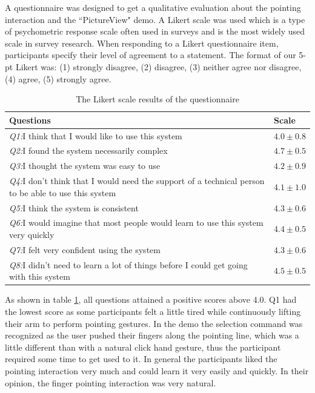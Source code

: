 A questionnaire was designed to get a qualitative evaluation about the pointing interaction and the ``PictureView" demo. A Likert scale was used which is a type of psychometric response scale often used in surveys and is the most widely used scale in survey research. When responding to a Likert questionnaire item, participants specify their level of agreement to a statement. The format of our 5-pt Likert was: (1) strongly disagree, (2) disagree, (3) neither agree nor disagree, (4) agree, (5) strongly agree.
\begin{table}
	\caption{The Likert scale results of the questionnaire}
	\label{tb:4-PAST:questionnaire}
	\scriptsize
	\begin{center}
		\begin{tabular}{p{5.5cm}|p{1.2cm}}
			Questions & Scale \\
			\hline
			\textit{Q1:}I think that I would like to use this system &  $4.0\pm0.8$ \\
			\textit{Q2:}I found the system necessarily complex & $4.7\pm0.5$ \\
			\textit{Q3:}I thought the system was easy to use & $4.2\pm0.9$ \\
			\textit{Q4:}I don't think that I would need the support of a technical person to be able to use this system & $4.1\pm1.0$\\
			\textit{Q5:}I  think the system is consistent & $4.3\pm0.6$ \\
			\textit{Q6:}I would imagine that most people would learn to use this system very quickly & $4.4\pm0.5$ \\
			\textit{Q7:}I felt very confident using the system & $4.3\pm0.6$ \\
			\textit{Q8:}I didn't need to learn a lot of things before I could get going with this system & $4.5\pm0.5$
		\end{tabular}
	\end{center}
\end{table}
As shown in table \ref{tb:4-PAST:questionnaire}, all questions attained a positive scores above 4.0. Q1 had the lowest score as some participants felt a little tired while continuously lifting their arm to perform pointing gestures. In the demo the selection command was recognized as the user pushed their fingers along the pointing line, which was a little different than with a natural click hand gesture, thus the participant required some time to get used to it. In general the participants liked the pointing interaction very much and could learn it very easily and quickly. In their opinion, the finger pointing interaction was very natural. 

